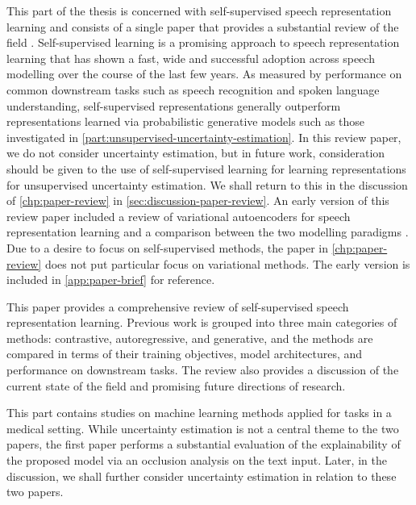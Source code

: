This part of the thesis is concerned with self-supervised speech representation learning and consists of a single paper that provides a substantial review of the field \parencite{mohamed_selfsupervised_2022}. 
Self-supervised learning is a promising approach to speech representation learning that has shown a fast, wide and successful adoption across speech modelling over the course of the last few years. 
As measured by performance on common downstream tasks such as speech recognition and spoken language understanding, self-supervised representations generally outperform representations learned via probabilistic generative models such as those investigated in \cref{part:unsupervised-uncertainty-estimation}. 
In this review paper, we do not consider uncertainty estimation, but in future work, consideration should be given to the use of self-supervised learning for learning representations for unsupervised uncertainty estimation. We shall return to this in the discussion of \cref{chp:paper-review} in \cref{sec:discussion-paper-review}.
An early version of this review paper included a review of variational autoencoders for speech representation learning and a comparison between the two modelling paradigms \parencite{borgholt_brief_2022}. 
Due to a desire to focus on self-supervised methods, the paper in \cref{chp:paper-review} does not put particular focus on variational methods. 
The early version is included in \cref{app:paper-brief} for reference.

This paper provides a comprehensive review of self-supervised speech representation learning. Previous work is grouped into three main categories of methods: contrastive, autoregressive, and generative, and the methods are compared in terms of their training objectives, model architectures, and performance on downstream tasks. The review also provides a discussion of the current state of the field and promising future directions of research. 

 
This part contains studies on machine learning methods applied for tasks in a medical setting. While uncertainty estimation is not a central theme to the two papers, the first paper performs a substantial evaluation of the explainability of the proposed model via an occlusion analysis on the text input. Later, in the discussion, we shall further consider uncertainty estimation in relation to these two papers.

